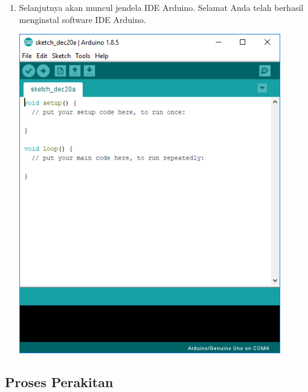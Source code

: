 \begin{enumerate}
\item Selanjutnya akan muncul jendela IDE Arduino. Selamat Anda telah berhasil menginstal software IDE Arduino.
\break\\
\centerline{\includegraphics[width=0.9\textwidth]{figures/aride12.png}}
\end{enumerate}

\subsection{Proses Perakitan}

